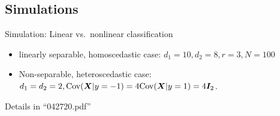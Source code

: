 \documentclass[compress,dvipsnames]{beamer}
\let\olditem\item
\renewcommand\item{\olditem\justifying}
\begin{document}
\subsection{Simulations}
\begin{frame}{Simulation: Linear vs.\ nonlinear classification}
\begin{itemize}
\item linearly separable, homoscedastic case: $d_1=10, d_2=8, r=3, N=100$
\begin{table}[h!]
    \centering
    \caption{\scriptsize  Classification accuracy on 5 folded Cross validation(CV)}
    \label{tab:sim1.1}
\end{table}



\item Non-separable, heteroscedastic case: $d_1=d_2=2, \text{Cov}(\bm{X}|y=-1)=4\text{Cov}(\bm{X}|y=1)=4\bm{I}_2$.
\begin{table}[h!]
    \centering
    \caption{\scriptsize Averaged classification accuracy of 5 folded CV according to different methods.}
    \label{tab:cv}
\end{table}
\end{itemize}
{\scriptsize Details in ``042720.pdf''}
\end{frame}
\end{document}
